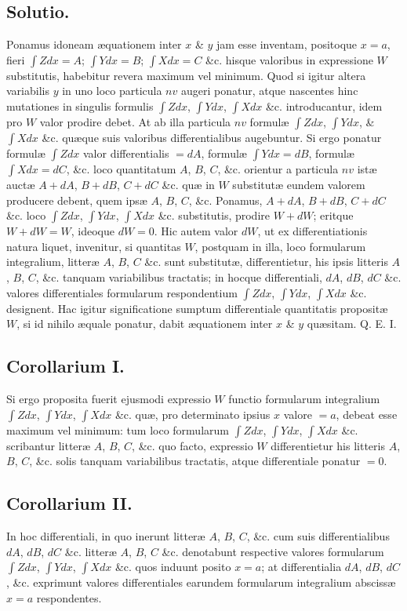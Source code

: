 \subsection*{Solutio.}
Ponamus idoneam æquationem inter $x$ \& $y$ jam esse inventam, positoque $x=a$, fieri $\int Zdx=A$; $\int Ydx=B$; $\int Xdx=C$ \&c. hisque valoribus in expressione $W$ substitutis, habebitur revera maximum vel minimum. Quod si igitur altera variabilis $y$ in uno loco particula $nv$ augeri ponatur, atque nascentes hinc mutationes in singulis formulis $\int Zdx$, $\int Ydx$, $\int Xdx$ \&c. introducantur, idem pro $W$ valor prodire debet. At ab illa particula $nv$ formulæ $\int Zdx$, $\int Ydx$, \& $\int Xdx$ \&c. quæque suis valoribus differentialibus augebuntur. Si ergo ponatur formulæ $\int Zdx$ valor differentialis $=dA$, formulæ $\int Ydx=dB$, formulæ $\int Xdx=dC$, \&c. loco quantitatum $A$, $B$, $C$, \&c. orientur a particula $nv$ istæ auctæ $A+dA$, $B+dB$, $C+dC$ \&c. quæ in $W$ substitutæ eundem valorem producere debent, quem ipsæ $A$, $B$, $C$, \&c. Ponamus, $A+dA$, $B+dB$, $C+dC$ \&c. loco $\int Zdx$, $\int Ydx$, $\int Xdx$ \&c. substitutis, prodire $W+dW$; eritque $W+dW=W$, ideoque $dW=0$. Hic autem valor $dW$, ut ex differentiationis natura liquet, invenitur, si quantitas $W$, postquam in illa, loco formularum integralium, litteræ $A$, $B$, $C$ \&c. sunt substitutæ, differentietur, his ipsis litteris $A$, $B$, $C$, \&c. tanquam variabilibus tractatis; in hocque differentiali, $dA$, $dB$, $dC$ \&c. valores differentiales formularum respondentium $\int Zdx$, $\int Ydx$, $\int Xdx$ \&c. designent. Hac igitur significatione sumptum differentiale quantitatis propositæ $W$, si id nihilo æquale ponatur, dabit æquationem inter $x$ \& $y$ quæsitam. Q. E. I.
\subsection*{Corollarium I.}
Si ergo proposita fuerit ejusmodi expressio $W$ functio formularum integralium $\int Zdx$, $\int Ydx$, $\int Xdx$ \&c. quæ, pro determinato ipsius $x$ valore $=a$, debeat esse maximum vel minimum: tum loco formularum $\int Zdx$, $\int Ydx$, $\int Xdx$ \&c. scribantur litteræ $A$, $B$, $C$, \&c. quo facto, expressio $W$ differentietur his litteris $A$, $B$, $C$, \&c. solis tanquam variabilibus tractatis, atque differentiale ponatur $=0$.
\subsection*{Corollarium II.}
In hoc differentiali, in quo inerunt litteræ $A$, $B$, $C$, \&c. cum suis differentialibus $dA$, $dB$, $dC$ \&c. litteræ $A$, $B$, $C$ \&c. denotabunt respective valores formularum $\int Zdx$, $\int Ydx$, $\int Xdx$ \&c. quos induunt posito $x=a$; at differentialia $dA$, $dB$, $dC$, \&c. exprimunt valores differentiales earundem formularum integralium abscissæ $x=a$ respondentes.
